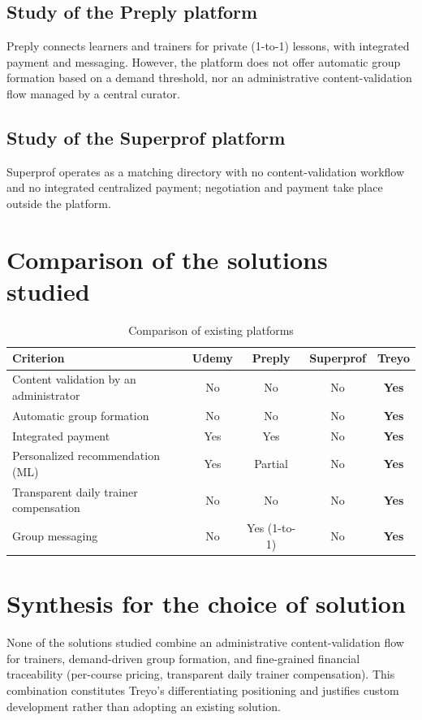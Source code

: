 \documentclass[a4paper,12pt]{report}
\begin{document}
\subsection{Study of the Preply platform}
Preply connects learners and trainers for private (1-to-1) lessons, with
integrated payment and messaging. However, the platform does not offer
automatic group formation based on a demand threshold, nor an
administrative content-validation flow managed by a central curator.

\subsection{Study of the Superprof platform}
Superprof operates as a matching directory with no content-validation
workflow and no integrated centralized payment; negotiation and payment
take place outside the platform.

\section{Comparison of the solutions studied}

\begin{table}[H]
\centering
\caption{Comparison of existing platforms}
\begin{tabular}{|P{3cm}|c|c|c|c|}
\hline
{}
\textbf{Criterion} & \textbf{Udemy} & \textbf{Preply} & \textbf{Superprof} & \textbf{Treyo} \\
\hline
Content validation by an administrator & No & No & No & \textbf{Yes} \\
\hline
Automatic group formation & No & No & No & \textbf{Yes} \\
\hline
Integrated payment & Yes & Yes & No & \textbf{Yes} \\
\hline
Personalized recommendation (ML) & Yes & Partial & No & \textbf{Yes} \\
\hline
Transparent daily trainer compensation & No & No & No & \textbf{Yes} \\
\hline
Group messaging & No & Yes (1-to-1) & No & \textbf{Yes} \\
\hline
\end{tabular}
\end{table}

\section{Synthesis for the choice of solution}
None of the solutions studied combine an administrative content-validation
flow for trainers, demand-driven group formation, and fine-grained
financial traceability (per-course pricing, transparent daily trainer
compensation). This combination constitutes Treyo's differentiating
positioning and justifies custom development rather than adopting an
existing solution.
\end{document}
